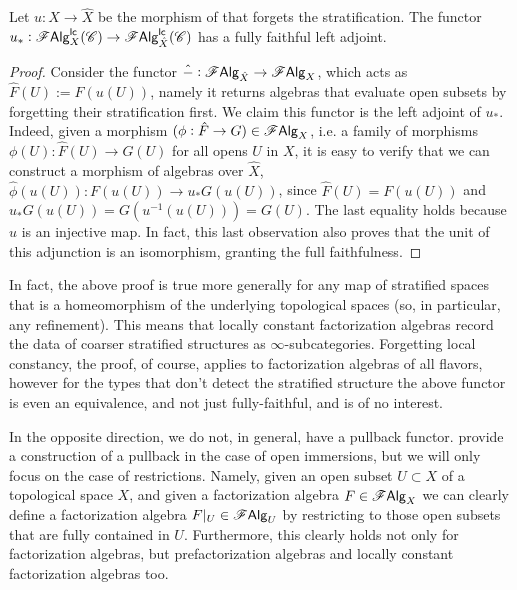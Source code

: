 \documentclass[../text]{subfiles}
\begin{document}
\begin{lemma}\label{lem:ff_functor_to_refinement}
    Let $u: X \rightarrow \hat{X}$ be the morphism of  that forgets the stratification.
    The functor $u_*: \mathscr{F} \mathsf{Alg}^{\mathsf{lc}}_{X} (\mathscr{C}) \rightarrow \mathscr{F} \mathsf{Alg}^{\mathsf{lc}}_{\hat{X}} (\mathscr{C})$ has a fully faithful left adjoint.
\end{lemma}

\begin{proof}
    Consider the functor $\hat{-}: \mathscr{F} \mathsf{Alg}_{\hat{X}} \rightarrow \mathscr{F} \mathsf{Alg}_{X}$, which acts as $\hat{F}(U) := F(u(U))$, namely it returns algebras that evaluate open subsets by forgetting their stratification first. We claim this functor is the left adjoint of $u_*$. Indeed, given a morphism $(\phi: \hat{F} \rightarrow G) \in \mathscr{F} \mathsf{Alg}_{X}$, i.e. a family of morphisms $\phi(U): \hat{F}(U) \rightarrow G(U)$ for all opens $U$ in $X$, it is easy to verify that we can construct a morphism of algebras over $\hat{X}$, $\hat{\phi}(u(U)): F(u(U)) \rightarrow u_*G (u(U))$, since $\hat{F}(U) = F(u(U))$ and $u_*G(u(U)) = G(u^{-1}(u(U))) = G(U)$. The last equality holds because $u$ is an injective map. In fact, this last observation also proves that the unit of this adjunction is an isomorphism, granting the full faithfulness.
\end{proof}

\begin{remark}
    In fact, the above proof is true more generally for any map of stratified spaces that is a homeomorphism of the underlying topological spaces (so, in particular, any refinement). This means that locally constant factorization algebras record the data of coarser stratified structures as $\infty$-subcategories. Forgetting local constancy, the proof, of course, applies to factorization algebras of all flavors, however for the types that don't detect the stratified structure the above functor is even an equivalence, and not just fully-faithful, and is of no interest.
\end{remark}


In the opposite direction, we do not, in general, have a pullback functor. \cite{cg2016} provide a construction of a pullback in the case of open immersions, but we will only focus on the case of restrictions. Namely, given an open subset $U \subset X$ of a topological space $X$, and given a factorization algebra $F \in \mathscr{F} \mathsf{Alg}_X$ we can clearly define a factorization algebra $F|_{U} \in \mathscr{F} \mathsf{Alg}_U$ by restricting to those open subsets that are fully contained in $U$. Furthermore, this clearly holds not only for factorization algebras, but prefactorization algebras and locally constant factorization algebras too.
\end{document}
